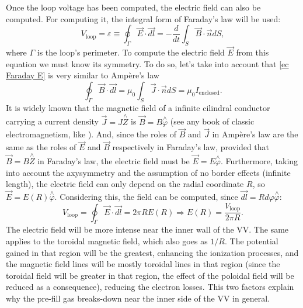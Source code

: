 \documentclass[a4paper,12pt,oneside]{book}
\begin{document}
Once the loop voltage has been computed, the electric field can also be computed. For computing it, the integral form of Faraday's law will be used:
%
\begin{equation} \label{ec Faraday E}
V_\text{loop}=\varepsilon \equiv \oint_\Gamma \vec{E} \cdot \vec{dl}= -\dfrac{d}{dt} \int_S \vec{B} \cdot \vec{n} dS,
\end{equation}
where $\Gamma$ is the loop's perimeter. To compute the electric field $\vec{E}$ from this equation we must know its symmetry. To do so, let's take into account that \eqref{ec Faraday E} is very similar to Ampère's law
%
\begin{equation}\label{ec Ampere}
\oint_\Gamma \vec{B} \cdot \vec{dl}=\mu_0 \int_S \vec{J} \cdot \vec{n} dS=\mu_0 I_\text{enclosed}.
\end{equation}
It is widely known that the magnetic field of a infinite cilindral conductor carrying a current density $\vec{J}=J \stackrel{\wedge}{Z}$ is $\vec{B}=B \stackrel{\wedge}{\varphi}$ (see any book of classic electromagnetism, like \cite{Griffiths}). And, since the roles of $\vec{B}$ and $\vec{J}$ in Ampère's law are the same as the roles of $\vec{E}$ and $\vec{B}$ respectively in Faraday's law, provided that $\vec{B}=B \stackrel{\wedge}{Z}$ in Faraday's law, the electric field must be $\vec{E}=E \stackrel{\wedge}{\varphi}$. Furthermore, taking into account the axysymmetry and the assumption of no border effects (infinite length), the electric field can only depend on the radial coordinate $R$, so $\vec{E}=E(R) \stackrel{\wedge}{\varphi}$. Considering this, the field can be computed, since $\vec{dl}=R d\varphi \stackrel{\wedge}{\varphi}$:
%
\begin{equation}\label{ec_E_sol}
V_\text{loop} = \oint_\Gamma \vec{E} \cdot \vec{dl}= 2 \pi R E(R) \Rightarrow E(R)= \dfrac{V_\text{loop}}{2 \pi R}.
\end{equation}
%
The electric field will be more intense near the inner wall of the VV. The same applies to the toroidal magnetic field, which also goes as $1/R$. The potential gained in that region will be the greatest, enhancing the ionization processes, and the magnetic field lines will be mostly toroidal lines in that region (since the toroidal field will be greater in that region, the effect of the poloidal field will be reduced as a consequence), reducing the electron losses. This two factors explain why the pre-fill gas breaks-down near the inner side of the VV in general.


\end{document}
